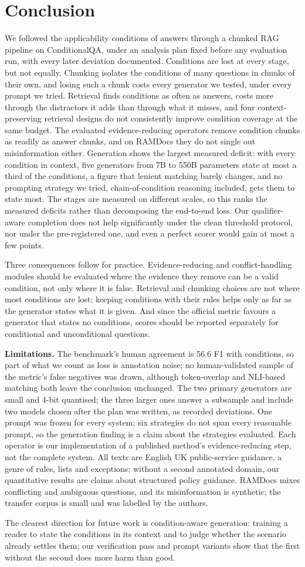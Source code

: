 \section{Conclusion}

We followed the applicability conditions of answers through a chunked RAG pipeline on ConditionalQA, under an analysis plan fixed before any evaluation run, with every later deviation documented. Conditions are lost at every stage, but not equally. Chunking isolates the conditions of many questions in chunks of their own, and losing such a chunk costs every generator we tested, under every prompt we tried. Retrieval finds conditions as often as answers, costs more through the distractors it adds than through what it misses, and four context-preserving retrieval designs do not consistently improve condition coverage at the same budget. The evaluated evidence-reducing operators remove condition chunks as readily as answer chunks, and on RAMDocs they do not single out misinformation either. Generation shows the largest measured deficit: with every condition in context, five generators from 7B to 550B parameters state at most a third of the conditions, a figure that lenient matching barely changes, and no prompting strategy we tried, chain-of-condition reasoning included, gets them to state most. The stages are measured on different scales, so this ranks the measured deficits rather than decomposing the end-to-end loss. Our qualifier-aware completion does not help significantly under the clean threshold protocol, nor under the pre-registered one, and even a perfect scorer would gain at most a few points.

Three consequences follow for practice. Evidence-reducing and conflict-handling modules should be evaluated where the evidence they remove can be a valid condition, not only where it is false. Retrieval and chunking choices are not where most conditions are lost; keeping conditions with their rules helps only as far as the generator states what it is given. And since the official metric favours a generator that states no conditions, scores should be reported separately for conditional and unconditional questions.

\textbf{Limitations.} The benchmark's human agreement is 56.6 F1 with conditions, so part of what we count as loss is annotation noise; no human-validated sample of the metric's false negatives was drawn, although token-overlap and NLI-based matching both leave the conclusion unchanged. The two primary generators are small and 4-bit quantised; the three larger ones answer a subsample and include two models chosen after the plan was written, as recorded deviations. One prompt was frozen for every system; six strategies do not span every reasonable prompt, so the generation finding is a claim about the strategies evaluated. Each operator is our implementation of a published method's evidence-reducing step, not the complete system. All texts are English UK public-service guidance, a genre of rules, lists and exceptions; without a second annotated domain, our quantitative results are claims about structured policy guidance. RAMDocs mixes conflicting and ambiguous questions, and its misinformation is synthetic; the transfer corpus is small and was labelled by the authors.

The clearest direction for future work is condition-aware generation: training a reader to state the conditions in its context and to judge whether the scenario already settles them; our verification pass and prompt variants show that the first without the second does more harm than good.
